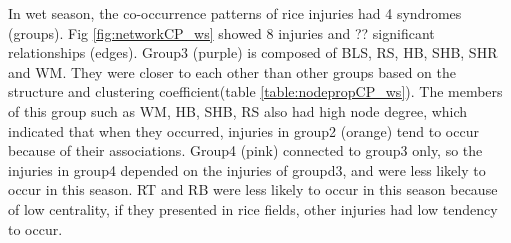 In wet season, the co-occurrence patterns of rice injuries had 4 syndromes (groups).  Fig \ref{fig:networkCP_ws} showed 8 injuries and ??  significant relationships (edges). Group3 (purple) is composed of BLS, RS, HB, SHB, SHR and WM. They were closer to each other than other groups based on the structure and clustering coefficient(table \ref{table:nodepropCP_ws}). The members of this group such as WM, HB, SHB, RS also had high node degree, which indicated that when they occurred, injuries in group2 (orange) tend to occur because of their associations. Group4 (pink) connected to group3 only, so the injuries in group4 depended on the injuries of groupd3, and were less likely to occur in this season.  RT and RB were less likely to occur in this season because of low centrality, if they presented in rice fields, other injuries had low tendency to occur. 

